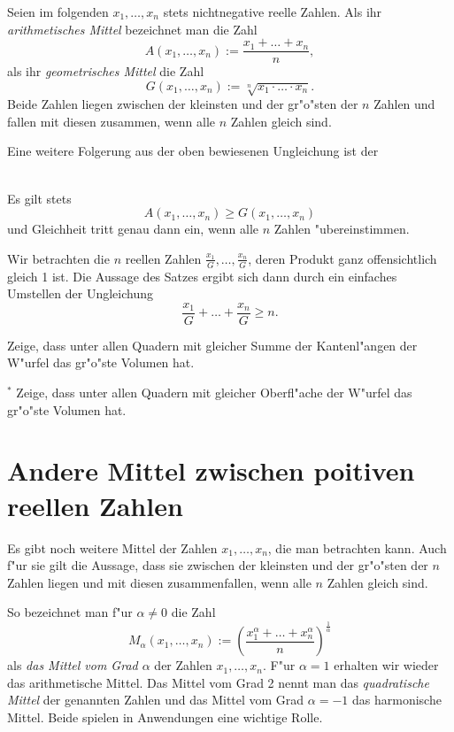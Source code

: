\documentclass[11pt]{article}
\begin{document}
Seien im folgenden $x_{1},\ldots,x_{n}$ stets nichtnegative reelle
Zahlen. Als ihr {\em arithmetisches Mittel} bezeichnet man die Zahl
\[A(x_{1},\ldots,x_{n}):=\frac{x_{1}+\ldots +x_{n}}{n},\]
als ihr {\em geometrisches Mittel} die Zahl
\[G(x_{1},\ldots,x_{n}):=\sqrt[n]{x_{1}\cdot\ldots\cdot x_{n}}.\]
Beide Zahlen liegen zwischen der kleinsten und der gr"o"sten der $n$ Zahlen
und fallen mit diesen zusammen, wenn alle $n$ Zahlen gleich sind.

Eine weitere Folgerung aus der oben bewiesenen Ungleichung ist der 
\begin{satz} 
\mbox{}\\[8pt] Es gilt stets
\[A(x_{1},\ldots,x_{n})\geq G(x_{1},\ldots,x_{n})\]
und Gleichheit tritt genau dann ein, wenn alle $n$ Zahlen "ubereinstimmen. 
\end{satz}

\begin{beweis} Wir betrachten die $n$ reellen Zahlen
  $\frac{{x_1}}{G}, \ldots, \frac{{x_n}}{G}$, deren Produkt ganz
  offensichtlich gleich 1 ist.  Die Aussage des Satzes ergibt sich dann durch
  ein einfaches Umstellen der Ungleichung
\[\frac{{x_1}}{G} + \ldots + \frac{{x_n}}{G}\geq n.\]
\end{beweis}

\begin{aufgabe} Zeige, dass unter allen Quadern mit gleicher Summe der
  Kantenl"angen der W"urfel das gr"o"ste Volumen hat.
\end{aufgabe}

\begin{aufgabe}$^{*}$ Zeige, dass unter allen Quadern mit gleicher Oberfl"ache
  der W"urfel das gr"o"ste Volumen hat.
\end{aufgabe}

\section{Andere Mittel zwischen poitiven reellen Zahlen}

Es gibt noch weitere Mittel der Zahlen $x_{1},\ldots,x_{n}$, die man
betrachten kann. Auch f"ur sie gilt die Aussage, dass sie zwischen der
kleinsten und der gr"o"sten der $n$ Zahlen liegen und mit diesen
zusammenfallen, wenn alle $n$ Zahlen gleich sind.

So bezeichnet man f"ur $\alpha\neq 0$ die Zahl
\[M_{\alpha}(x_{1},\ldots,x_{n}):=\left(\frac{x_{1}^{\alpha} + \ldots +
    x_{n}^{\alpha }}{n}\right)^\frac{1}{\alpha}\]
als {\em das Mittel vom Grad $\alpha$} der Zahlen $x_{1},\ldots,x_{n}$. F"ur
$\alpha=1 $ erhalten wir wieder das arithmetische Mittel. Das Mittel vom Grad
2 nennt man das {\em quadratische Mittel} der genannten Zahlen und das Mittel
vom Grad $\alpha=-1$ das harmonische Mittel. Beide spielen in Anwendungen eine
wichtige Rolle. 
\end{document}
